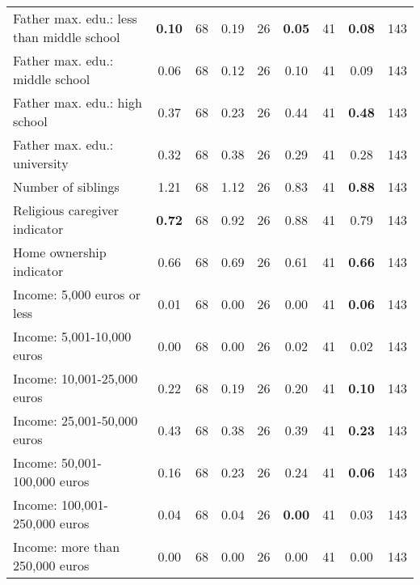 \begin{tabular}{l c c c c c c c c}
Father max. edu.: less than middle school & \textbf{     0.10} &        68 &      0.19 &        26 & \textbf{     0.05} &        41 & \textbf{     0.08} &       143 \\
Father max. edu.: middle school &      0.06 &        68 &      0.12 &        26 &      0.10 &        41 &      0.09 &       143 \\
Father max. edu.: high school &      0.37 &        68 &      0.23 &        26 &      0.44 &        41 & \textbf{     0.48} &       143 \\
Father max. edu.: university &      0.32 &        68 &      0.38 &        26 &      0.29 &        41 &      0.28 &       143 \\
Number of siblings &      1.21 &        68 &      1.12 &        26 &      0.83 &        41 & \textbf{     0.88} &       143 \\
Religious caregiver indicator & \textbf{     0.72} &        68 &      0.92 &        26 &      0.88 &        41 &      0.79 &       143 \\
Home ownership indicator &      0.66 &        68 &      0.69 &        26 &      0.61 &        41 & \textbf{     0.66} &       143 \\
Income: 5,000 euros or less &      0.01 &        68 &      0.00 &        26 &      0.00 &        41 & \textbf{     0.06} &       143 \\
Income: 5,001-10,000 euros &      0.00 &        68 &      0.00 &        26 &      0.02 &        41 &      0.02 &       143 \\
Income: 10,001-25,000 euros &      0.22 &        68 &      0.19 &        26 &      0.20 &        41 & \textbf{     0.10} &       143 \\
Income: 25,001-50,000 euros &      0.43 &        68 &      0.38 &        26 &      0.39 &        41 & \textbf{     0.23} &       143 \\
Income: 50,001-100,000 euros &      0.16 &        68 &      0.23 &        26 &      0.24 &        41 & \textbf{     0.06} &       143 \\
Income: 100,001-250,000 euros &      0.04 &        68 &      0.04 &        26 & \textbf{     0.00} &        41 &      0.03 &       143 \\
Income: more than 250,000 euros &      0.00 &        68 &      0.00 &        26 &      0.00 &        41 &      0.00 &       143 \\
\bottomrule
\end{tabular}
